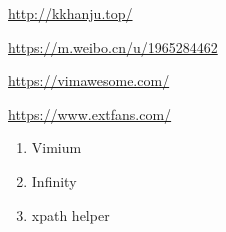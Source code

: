 \documentclass[a4paper]{ctexart}    %
\begin{document}
\begin{tcolorbox}[
         colback=red!5!white,
         colframe=teal,
         title=\textbf{韩剧网}
    ]
    \href{http://kkhanju.top/}{http://kkhanju.top/}
\end{tcolorbox}
\begin{tcolorbox}[
         colback=red!5!white,
         colframe=teal,
         title=\textbf{韩国电影微博}
    ]
    \href{https://m.weibo.cn/u/1965284462}{https://m.weibo.cn/u/1965284462}
\end{tcolorbox}
\begin{tcolorbox}[
         colback=red!5!white,
         colframe=teal,
         title=\textbf{vimawesome}
    ]
    \href{https://vimawesome.com/}{https://vimawesome.com/}
\end{tcolorbox}
\begin{tcolorbox}[
         colback=red!5!white,
         colframe=teal,
         title=\textbf{Extfans谷歌浏览器扩展}
    ]
    \href{https://www.extfans.com/}{https://www.extfans.com/}
    \begin{enumerate}
        \item Vimium
        \item Infinity
        \item xpath helper
    \end{enumerate}

\end{tcolorbox}
\end{document}
